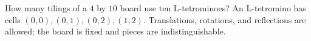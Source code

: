How many tilings of a $4$ by $10$ board use ten L-tetrominoes? An L-tetromino has cells $(0,0),(0,1),(0,2),(1,2)$. Translations, rotations, and reflections are allowed; the board is fixed and pieces are indistinguishable.
